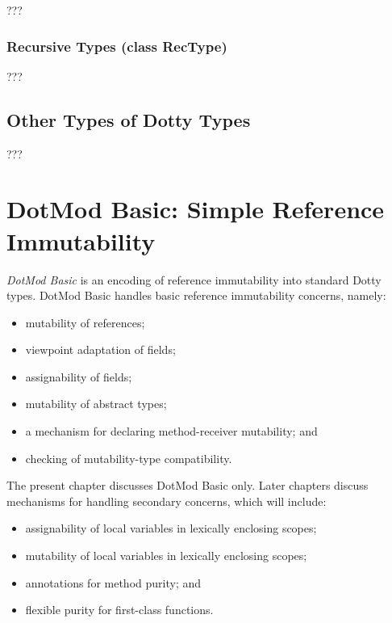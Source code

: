 \documentclass[11pt]{report}
\begin{document}
???

\subsection{Recursive Types (class RecType)}

???


\section{Other Types of Dotty Types} \label{sec:other-types}

???





\chapter{DotMod Basic: Simple Reference Immutability} \label{chap:dotmod-basic}


{\em DotMod Basic} is an encoding of reference immutability into standard Dotty types.
DotMod Basic handles basic reference immutability concerns, namely:
\begin{itemize}
\item mutability of references;
\item viewpoint adaptation of fields;
\item assignability of fields;
\item mutability of abstract types;
\item a mechanism for declaring method-receiver mutability; and
\item checking of mutability-type compatibility.
\end{itemize}

The present chapter discusses DotMod Basic only. Later chapters discuss mechanisms for handling secondary concerns, which will include:
\begin{itemize}
\item assignability of local variables in lexically enclosing scopes;
\item mutability of local variables in lexically enclosing scopes;
\item annotations for method purity; and
\item flexible purity for first-class functions.
\end{itemize}
\end{document}
